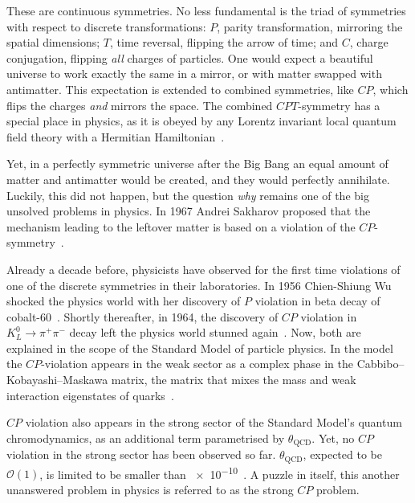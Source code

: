 These are continuous symmetries. No less fundamental is the triad of symmetries with respect to discrete transformations: $P$, parity transformation, mirroring the spatial dimensions; $T$, time reversal, flipping the arrow of time; and $C$, charge conjugation, flipping \emph{all} charges of particles. One would expect a beautiful universe to work exactly the same in a mirror, or with matter swapped with antimatter. This expectation is extended to combined symmetries, like $CP$, which flips the charges \emph{and} mirrors the space. The combined $CPT$-symmetry has a special place in physics, as it is obeyed by any Lorentz invariant local quantum field theory with a Hermitian Hamiltonian~\cite{Sachs1987}.

Yet, in a perfectly symmetric universe after the Big Bang an equal amount of matter and antimatter would be created, and they would perfectly annihilate. Luckily, this did not happen, but the question \emph{why} remains one of the big unsolved problems in physics.
In 1967 Andrei Sakharov proposed that the mechanism leading to the leftover matter  is based on a violation of the $CP$-symmetry~\cite{0038-5670-34-5-A08}.

Already a decade before, physicists have observed for the first time violations of one of the discrete symmetries in their laboratories.
In 1956 Chien-Shiung Wu shocked the physics world with her discovery of $P$ violation in beta decay of cobalt-60~\cite{PhysRev.105.1413}. Shortly thereafter, in 1964, the discovery of $CP$ violation in $K^0_L \rightarrow \pi^+ \pi^-$ decay left the physics world stunned again~\cite{PhysRevLett.13.138}. Now, both are explained in the scope of the Standard Model of particle physics. In the model the $CP$-violation appears in the weak sector as a complex phase in the Cabbibo--Kobayashi--Maskawa matrix, the matrix that mixes the mass and weak interaction eigenstates of quarks~\cite{doi:10.1143/PTP.49.652}.

$CP$ violation also appears in the strong sector of the Standard Model's quantum chromodynamics, as an additional term parametrised by $\theta_\text{QCD}$. Yet, no $CP$ violation in the strong sector has been observed so far. $\theta_\text{QCD}$, expected to be $\mathcal{O}(1)$, is limited to be smaller than \num{e-10}~\cite{PDG2016}. A puzzle in itself, this another unanswered problem in physics is referred to as the strong $CP$ problem.

